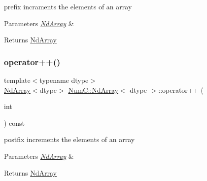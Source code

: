 prefix incraments the elements of an array


\begin{DoxyParams}{Parameters}
{\em \mbox{\hyperlink{class_num_c_1_1_nd_array}{Nd\+Array}}} & \\
\hline
\end{DoxyParams}
\begin{DoxyReturn}{Returns}
\mbox{\hyperlink{class_num_c_1_1_nd_array}{Nd\+Array}} 
\end{DoxyReturn}
\mbox{\label{class_num_c_1_1_nd_array_a47f9898e6fbe353942d90ed1f37ff79a}} 
\subsubsection{\texorpdfstring{operator++()}{operator++()}\hspace{0.1cm}{\footnotesize\ttfamily [2/2]}}
{\footnotesize\ttfamily template$<$typename dtype$>$ \\
\mbox{\hyperlink{class_num_c_1_1_nd_array}{Nd\+Array}}$<$dtype$>$ \mbox{\hyperlink{class_num_c_1_1_nd_array}{Num\+C\+::\+Nd\+Array}}$<$ dtype $>$\+::operator++ (\begin{DoxyParamCaption}\item[{int}]{ }\end{DoxyParamCaption}) const\hspace{0.3cm}{\ttfamily [inline]}}

postfix increments the elements of an array


\begin{DoxyParams}{Parameters}
{\em \mbox{\hyperlink{class_num_c_1_1_nd_array}{Nd\+Array}}} & \\
\hline
\end{DoxyParams}
\begin{DoxyReturn}{Returns}
\mbox{\hyperlink{class_num_c_1_1_nd_array}{Nd\+Array}} 
\end{DoxyReturn}
\mbox{\label{class_num_c_1_1_nd_array_ada038e83835f7cdcb8173ab7e40a7805}} 
